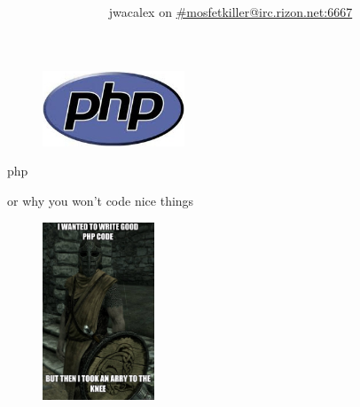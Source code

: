 \documentclass[final]{beamer}
\author{jwacalex on \href{http://chat.mibbit.com/?channel=\%23mosfetkiller\&nick=your\_nick\_here\&server=irc.rizon.net\&autoConnect=true}{\#mosfetkiller@irc.rizon.net:6667}}
\title{ }
\begin{document}
\begin{frame}
\begin{center}
\vspace{1em}
\vspace{0.4em}
\begin{figure}[ht]
  \centering
	\includegraphics[width=160px]{./../Graph/other/php.jpg}
\end{figure}
\vspace{0.4em}
\vspace{1em}
\end{center}
\end{frame}

\begin{frame}{php}
\begin{center}
\vspace{1em}
\vspace{0.4em}
\centering or why you won't code nice things
\vspace{0.4em}
\vspace{1em}
\end{center}
\end{frame}

\begin{frame}
\begin{center}
\begin{figure}[ht]
  \centering
	\includegraphics[height=200px]{./../Graph/Meme/arraytotheknee.jpg}
\end{figure}
\end{center}
\end{frame}
\end{document}
